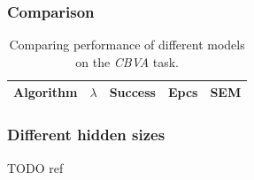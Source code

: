 \subsubsection{Comparison} 
\label{sec:results-cmp-k3} 


\begin{table}
  \centering
    \begin{tabular}{|l|l|l|l|l|}
    \hline
    Algorithm&$\lambda$&Success&Epcs&SEM \\
    \hline
    \end{tabular}
  \caption{Comparing performance of different models on the \emph{CBVA} task.} 
  \label{tab:results-cmp-k3}
\end{table}


\subsubsection{Different hidden sizes} 
\label{sec:results-dhs-k3} 

TODO ref 


